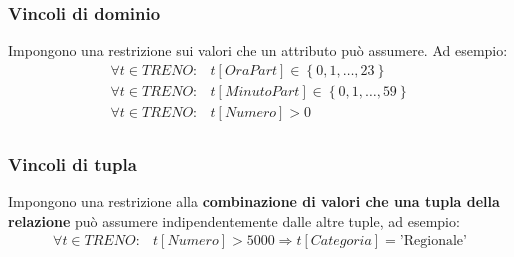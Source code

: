 \documentclass[a4paper,twoside]{article}
\begin{document}
\subsubsection{Vincoli di dominio}
Impongono una restrizione sui valori che un attributo può assumere. Ad esempio:
\[
    \begin{aligned}
      \forall t \in TRENO:& t[OraPart] \in \left\{ 0, 1, \ldots, 23 \right\}\\
      \forall t \in TRENO:& t[MinutoPart] \in \left\{ 0, 1, \ldots, 59 \right\}\\
      \forall t \in TRENO:& t[Numero] > 0\\
    \end{aligned}
\] 

\subsubsection{Vincoli di tupla}
Impongono una restrizione alla \textbf{combinazione di valori che una tupla della relazione}
può assumere indipendentemente dalle altre tuple, ad esempio:
\[
  \begin{aligned}
    \forall t \in TRENO:& t[Numero] > 5000 \Rightarrow t[Categoria] = \text{'Regionale'}\\
  \end{aligned}
\] 
\end{document}
